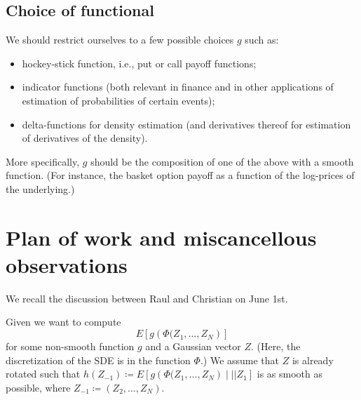 \documentclass[11pt]{article}
\begin{document}




\subsection{Choice of functional}
\label{sec:choice-functional}

We should restrict ourselves to a few possible choices $g$ such as:
\begin{itemize}
\item hockey-stick function, i.e., put or call payoff functions;
\item indicator functions (both relevant in finance and in other applications
  of estimation of probabilities of certain events);
\item delta-functions for density estimation (and derivatives thereof for
  estimation of derivatives of the density).
\end{itemize}
More specifically, $g$ should be the composition of one of the above with a
smooth function. (For instance, the basket option payoff as a function of the
log-prices of the underlying.)

\section{Plan of work and miscancellous observations}
\label{sec:plan-work-misc}

We recall the discussion between Raul and Christian on June 1st.

Given we want to compute
\begin{equation*}
  E\left[ g\left( \Phi(Z_1, \ldots, Z_N \right) \right]
\end{equation*}
for some non-smooth function $g$ and a Gaussian vector $Z$. (Here, the
discretization of the SDE is in the function $\Phi$.) We assume that
$Z$ is already rotated such that $h(Z_{-1}) \coloneqq E\left[ g\left(
    \Phi(Z_1, \ldots, Z_N \right) \mid | \mid Z_1\right]$ is as smooth as
possible, where $Z_{-1} \coloneqq (Z_2, \ldots, Z_N)$. 
\end{document}
